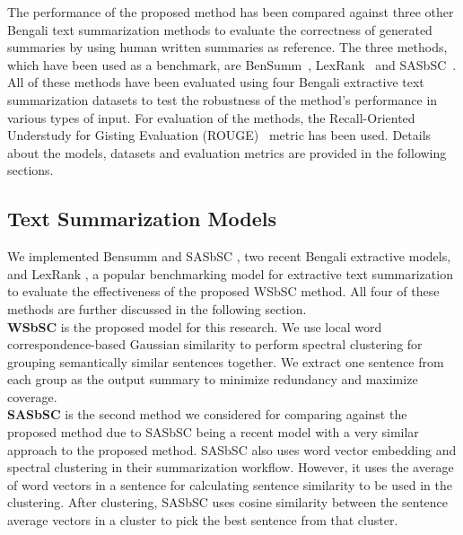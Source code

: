 The performance of the proposed method has been compared against three other Bengali text summarization methods to evaluate the correctness of generated summaries by using human written summaries as reference. The three methods, which have been used as a benchmark, are BenSumm~\cite{chowdhury-etal-2021-tfidf-clustering}, LexRank~\cite{Erkan-lexRank-2004} and SASbSC~\cite{roychowdhury-etal-2022-spectral-base}. All of these methods have been evaluated using four Bengali extractive text summarization datasets to test the robustness of the method's performance in various types of input. For evaluation of the methods, the Recall-Oriented Understudy for Gisting Evaluation (ROUGE)~\cite{lin-2004-rouge} metric has been used. Details about the models, datasets and evaluation metrics are provided in the following sections.

\subsection{Text Summarization Models}\label{subsec:text-summarization-models}
We implemented Bensumm \cite{chowdhury-etal-2021-tfidf-clustering} and SASbSC \cite{roychowdhury-etal-2022-spectral-base}, two recent Bengali extractive models, and LexRank \cite{Erkan-lexRank-2004}, a popular benchmarking model for extractive text summarization to evaluate the effectiveness of the proposed WSbSC method. All four of these methods are further discussed in the following section.\\

\textbf{WSbSC} is the proposed model for this research. We use local word correspondence-based Gaussian similarity to perform spectral clustering for grouping semantically similar sentences together. We extract one sentence from each group as the output summary to minimize redundancy and maximize coverage.\\

\textbf{SASbSC} \cite{roychowdhury-etal-2022-spectral-base} is the second method we considered for comparing against the proposed method due to SASbSC being a recent model with a very similar approach to the proposed method. SASbSC also uses word vector embedding and spectral clustering in their summarization workflow. However, it uses the average of word vectors in a sentence for calculating sentence similarity to be used in the clustering. After clustering, SASbSC uses cosine similarity between the sentence average vectors in a cluster to pick the best sentence from that cluster.\\

